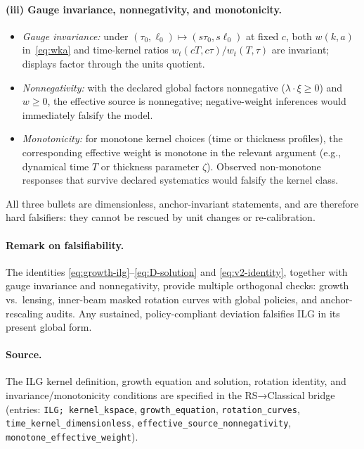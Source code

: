 \documentclass[11pt]{article}
\begin{document}
\paragraph{(iii) Gauge invariance, nonnegativity, and monotonicity.}
\begin{itemize}
\item \emph{Gauge invariance:} under $(\tau_0,\ell_0)\mapsto (s\tau_0, s\ell_0)$ at fixed $c$, both $w(k,a)$ in~\eqref{eq:wka} and time-kernel ratios $w_t(cT,c\tau)/w_t(T,\tau)$ are invariant; displays factor through the units quotient.
\item \emph{Nonnegativity:} with the declared global factors nonnegative ($\lambda\cdot\xi\ge 0$) and $w\ge 0$, the effective source is nonnegative; negative-weight inferences would immediately falsify the model.
\item \emph{Monotonicity:} for monotone kernel choices (time or thickness profiles), the corresponding effective weight is monotone in the relevant argument (e.g., dynamical time $T$ or thickness parameter $\zeta$). Observed non-monotone responses that survive declared systematics would falsify the kernel class.
\end{itemize}
All three bullets are dimensionless, anchor-invariant statements, and are therefore hard falsifiers: they cannot be rescued by unit changes or re-calibration. 

\paragraph{Remark on falsifiability.} The identities \eqref{eq:growth-ilg}--\eqref{eq:D-solution} and \eqref{eq:v2-identity}, together with gauge invariance and nonnegativity, provide multiple orthogonal checks: growth vs.\ lensing, inner-beam masked rotation curves with global policies, and anchor-rescaling audits. Any sustained, policy-compliant deviation falsifies ILG in its present global form.

\paragraph{Source.} The ILG kernel definition, growth equation and solution, rotation identity, and invariance/monotonicity conditions are specified in the RS→Classical bridge (entries: \texttt{ILG; kernel\_kspace}, \texttt{growth\_equation}, \texttt{rotation\_curves}, \texttt{time\_kernel\_dimensionless}, \texttt{effective\_source\_nonnegativity}, \texttt{monotone\_effective\_weight}). 
\end{document}
